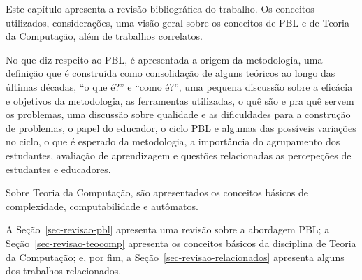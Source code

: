 \label{cap-revisao}
\acresetall

Este capítulo apresenta a revisão bibliográfica do trabalho.
Os conceitos utilizados, considerações, uma visão geral sobre os conceitos
de \ac{PBL} e de Teoria da Computação, além de trabalhos correlatos.

No que diz respeito ao \ac{PBL}, é apresentada a origem da metodologia,
uma definição que é construída como consolidação de alguns teóricos ao longo das últimas
décadas, ``o que é?'' e ``como é?'', uma pequena discussão sobre a eficácia e objetivos
da metodologia, as ferramentas utilizadas, o quê são e pra quê servem os problemas, uma
discussão sobre qualidade e as dificuldades para a construção de problemas, o papel
do educador, o ciclo \ac{PBL} e algumas das possíveis variações no ciclo, o que é
esperado da metodologia, a importância do agrupamento dos estudantes,
avaliação de aprendizagem e questões relacionadas as percepeções de estudantes
e educadores.

Sobre Teoria da Computação, são apresentados os conceitos
básicos de complexidade, computabilidade e autômatos.

A Seção~\ref{sec-revisao-pbl} apresenta uma revisão sobre a abordagem \ac{PBL};
a Seção~\ref{sec-revisao-teocomp} apresenta os conceitos básicos da disciplina
de Teoria da Computação;
e, por fim, a Seção~\ref{sec-revisao-relacionados} apresenta alguns dos trabalhos
relacionados.




